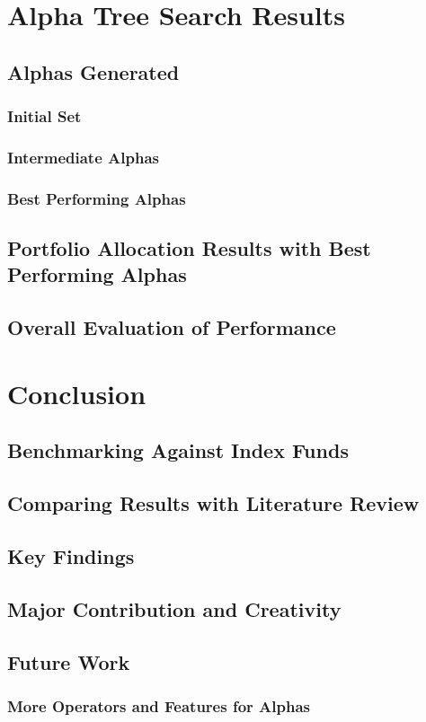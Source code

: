 \documentclass[a4paper,12pt]{report}
\numberwithin{equation}{section}
\theoremstyle{definition}
\begin{document}
\chapter{Alpha Tree Search Results}
\section{Alphas Generated}
\subsection{Initial Set}
\subsection{Intermediate Alphas}
\subsection{Best Performing Alphas}
\section{Portfolio Allocation Results with Best Performing Alphas}
\section{Overall Evaluation of Performance}


\chapter{Conclusion}
\section{Benchmarking Against Index Funds}
\section{Comparing Results with Literature Review}
\section{Key Findings}
\section{Major Contribution and Creativity}
\section{Future Work}
\subsection{More Operators and Features for Alphas}
\end{document}
